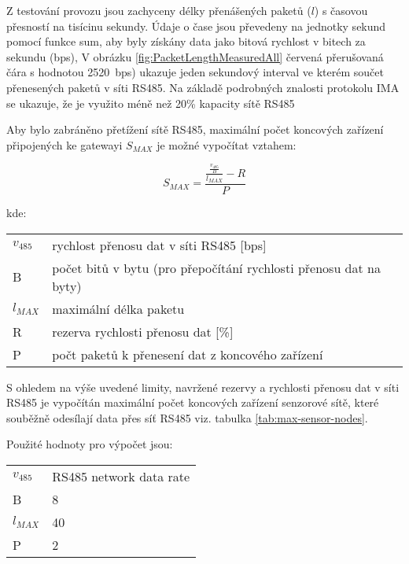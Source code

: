 Z testování provozu jsou zachyceny délky přenášených paketů ($ l $) s časovou přesností na tisícinu sekundy. Údaje o čase jsou převedeny na jednotky sekund pomocí funkce sum, aby byly získány data jako bitová rychlost v bitech za sekundu (bps),
V obrázku \ref{fig:PacketLengthMeasuredAll} červená přerušovaná čára s hodnotou 2520~bps) ukazuje jeden sekundový interval ve kterém součet přenesených paketů v síti RS485.
Na základě podrobných znalosti protokolu IMA se ukazuje, že je využito méně než 20\% kapacity sítě RS485 

Aby bylo zabráněno přetížení sítě RS485, maximální počet koncových zařízení připojených ke gatewayi $ S_{MAX} $ je možné vypočítat vztahem:

\begin{equation}
S_{MAX} = \frac{\frac{\frac{v_{485}}{B}}{l_{MAX}} - R}{P}
\label{equ:max-count-of-sensors}
\end{equation}

kde:

\begin{tabular}{l @{  } l}
$v_{485}$ & rychlost přenosu dat v síti RS485 [bps]\\
 B        & počet bitů v bytu (pro přepočítání rychlosti přenosu dat na byty) \\
$l_{MAX}$ & maximální délka paketu \\
 R        & rezerva rychlosti přenosu dat [\%]\\
 P        & počt paketů k přenesení dat z koncového zařízení \\
\end{tabular}


S ohledem na výše uvedené limity, navržené rezervy a rychlosti přenosu dat v síti RS485 je vypočítán maximální počet koncových zařízení senzorové sítě, které souběžně odesílají data přes síť RS485 viz. tabulka \ref{tab:max-sensor-nodes}.

Použité hodnoty pro výpočet jsou:

\begin{tabular}{l @{ $=$ } l}
$v_{485}$ & RS485 network data rate \\
 B        & 8 \\
$l_{MAX}$ & 40 \\
 P        & 2 \\
\end{tabular}

